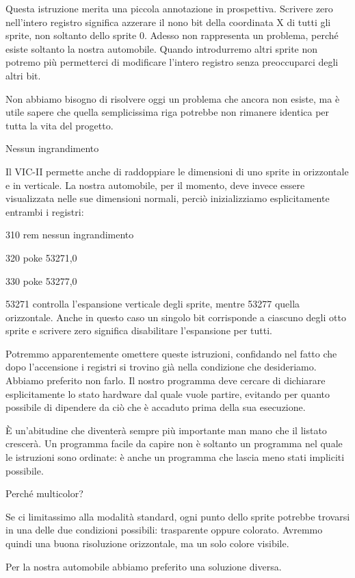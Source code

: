 \documentclass{article}
\begin{document}
Questa istruzione merita una piccola annotazione in prospettiva. Scrivere zero nell'intero registro significa azzerare
il nono bit della coordinata X di tutti gli sprite, non soltanto dello sprite 0. Adesso non rappresenta un problema,
perché esiste soltanto la nostra automobile. Quando introdurremo altri sprite non potremo più permetterci di modificare
l'intero registro senza preoccuparci degli altri bit.

Non abbiamo bisogno di risolvere oggi un problema che ancora non esiste, ma è utile sapere che quella semplicissima riga
potrebbe non rimanere identica per tutta la vita del progetto.

Nessun ingrandimento

Il VIC-II permette anche di raddoppiare le dimensioni di uno sprite in orizzontale e in verticale. La nostra automobile,
per il momento, deve invece essere visualizzata nelle sue dimensioni normali, perciò inizializziamo esplicitamente
entrambi i registri:

310 rem nessun ingrandimento

320 poke 53271,0

330 poke 53277,0

53271 controlla l'espansione verticale degli sprite, mentre 53277 quella orizzontale. Anche in questo caso un singolo
bit corrisponde a ciascuno degli otto sprite e scrivere zero significa disabilitare l'espansione per tutti.

Potremmo apparentemente omettere queste istruzioni, confidando nel fatto che dopo l'accensione i registri si trovino già
nella condizione che desideriamo. Abbiamo preferito non farlo. Il nostro programma deve cercare di dichiarare
esplicitamente lo stato hardware dal quale vuole partire, evitando per quanto possibile di dipendere da ciò che è
accaduto prima della sua esecuzione.

È un'abitudine che diventerà sempre più importante man mano che il listato crescerà. Un programma facile da capire non è
soltanto un programma nel quale le istruzioni sono ordinate: è anche un programma che lascia meno stati impliciti
possibile.

Perché multicolor?

Se ci limitassimo alla modalità standard, ogni punto dello sprite potrebbe trovarsi in una delle due condizioni
possibili: trasparente oppure colorato. Avremmo quindi una buona risoluzione orizzontale, ma un solo colore visibile.

Per la nostra automobile abbiamo preferito una soluzione diversa.
\end{document}
